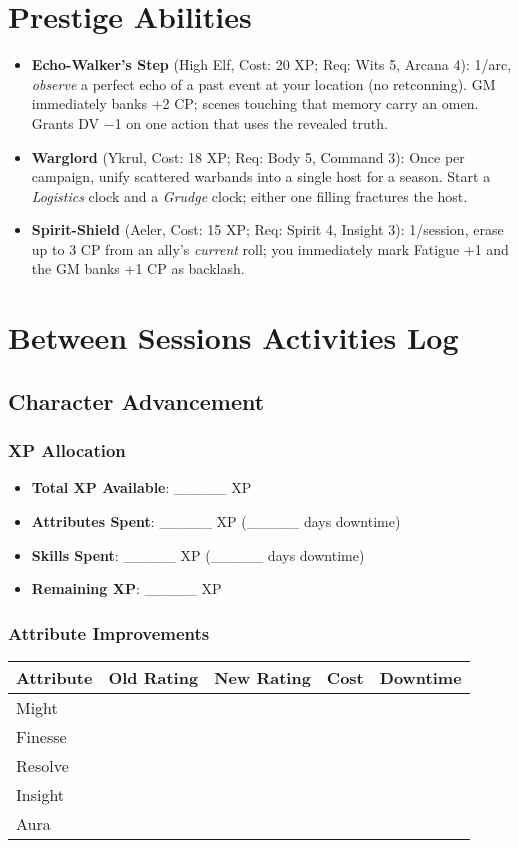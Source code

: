 \section{Prestige Abilities}
\begin{itemize}
    \item \textbf{Echo-Walker's Step} (High Elf, Cost: 20 XP; Req: Wits 5, Arcana 4): 
1/arc, \emph{observe} a perfect echo of a past event at your location (no retconning). 
GM immediately banks +2 CP; scenes touching that memory carry an omen. Grants DV −1 on one action that uses the revealed truth.
    \item \textbf{Warglord} (Ykrul, Cost: 18 XP; Req: Body 5, Command 3): 
Once per campaign, unify scattered warbands into a single host for a season. Start a \emph{Logistics} clock and a \emph{Grudge} clock; either one filling fractures the host.
    \item \textbf{Spirit-Shield} (Aeler, Cost: 15 XP; Req: Spirit 4, Insight 3): 
1/session, erase up to 3 CP from an ally's \emph{current} roll; you immediately mark Fatigue +1 and the GM banks +1 CP as backlash.
\end{itemize}

\section{Between Sessions Activities Log}

\subsection{Character Advancement}

\subsubsection{XP Allocation}
\begin{itemize}
    \item \textbf{Total XP Available}: \_\_\_\_\_ XP
    \item \textbf{Attributes Spent}: \_\_\_\_\_ XP (\_\_\_\_\_ days downtime)
    \item \textbf{Skills Spent}: \_\_\_\_\_ XP (\_\_\_\_\_ days downtime)
    \item \textbf{Remaining XP}: \_\_\_\_\_ XP
\end{itemize}

\subsubsection{Attribute Improvements}
\begin{tabular}{|p{3cm}|c|c|c|c|}
\hline
\textbf{Attribute} & \textbf{Old Rating} & \textbf{New Rating} & \textbf{Cost} & \textbf{Downtime} \\
\hline
Might & & & & \\
Finesse & & & & \\
Resolve & & & & \\
Insight & & & & \\
Aura & & & & \\
\hline
\end{tabular}

